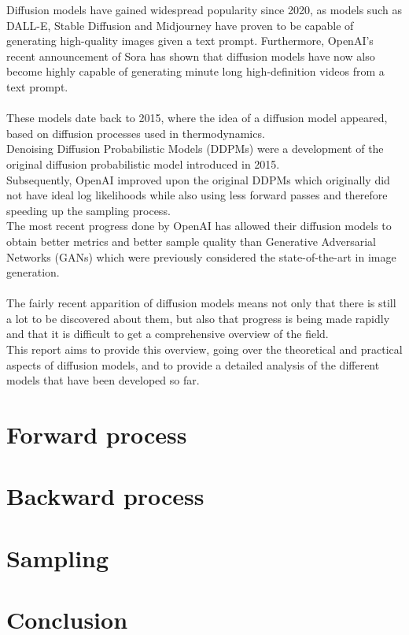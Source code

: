 \documentclass{article}
\begin{document}
Diffusion models have gained widespread popularity since 2020, as models such as DALL-E, Stable Diffusion and Midjourney have proven to be capable of generating high-quality images given a text prompt. Furthermore, OpenAI's recent announcement of Sora has shown that diffusion models have now also become highly capable of generating minute long high-definition videos from a text prompt. \cite{videoworldsimulators2024}
\\\\
These models date back to 2015, where the idea of a diffusion model appeared, based on diffusion processes used in thermodynamics. \cite{sohldickstein2015deep} \\
Denoising Diffusion Probabilistic Models (DDPMs) were a development of the original diffusion probabilistic model introduced in 2015. \cite{ho2020denoising} \\
Subsequently, OpenAI improved upon the original DDPMs which originally did not have ideal log likelihoods \cite{ho2020denoising} while also using less forward passes and therefore speeding up the sampling process. \cite{nichol2021improved} \\
The most recent progress done by OpenAI has allowed their diffusion models to obtain better metrics and better sample quality than Generative Adversarial Networks (GANs) which were previously considered the state-of-the-art in image generation. \cite{dhariwal2021diffusion}
\\\\
The fairly recent apparition of diffusion models means not only that there is still a lot to be discovered about them, but also that progress is being made rapidly and that it is difficult to get a comprehensive overview of the field. \\
This report aims to provide this overview, going over the theoretical and practical aspects of diffusion models, and to provide a detailed analysis of the different models that have been developed so far.


\newpage
\section{Forward process}

\newpage
\section{Backward process}

\newpage
\section{Sampling}

\newpage
\section{Conclusion}


\newpage
\printbibliography
\end{document}
